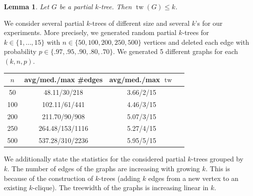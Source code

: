 \documentclass[11pt,a4paper]{article}
\newtheorem*{lemma}{Lemma}
\DeclareMathOperator{\tw}{tw}
\begin{document}
\begin{lemma}
Let $G$ be a partial $k$-tree. Then $\tw(G) \leq k$.
\end{lemma}

\newpage

We consider several partial $k$-trees of different size and several $k$'s for our experiments. More precisely, we generated random partial $k$-trees for $k \in \{1, \dots, 15\}$ with $n \in \{50,100,200,250,500\}$ vertices and deleted each edge with probability $p \in \{.97, .95, .90, .80, .70\}$. We generated 5 different graphs for each $(k, n, p)$.

\begin{center}
\begin{table}[h!]
\centering
\begin{tabular}{|c|c|c|c|}
\hline
$n$ & avg/med./max \#edges & avg/med./max $\tw$ \\
\hline \hline
50 & 48.11/30/218 & 3.66/2/15 \\
\hline
100 & 102.11/61/441 & 4.46/3/15 \\
\hline
200 & 211.70/90/908 & 5.07/3/15 \\
\hline
250 & 264.48/153/1116 & 5.27/4/15 \\
\hline
500 & 537.28/310/2236 & 5.95/5/15 \\
\hline
\end{tabular}
\end{table}
\end{center}

\vspace*{-7mm}

We additionally state the statistics for the considered partial $k$-trees grouped by $k$. The number of edges of the graphs are increasing with growing $k$. This is because of the construction of $k$-trees (adding $k$ edges from a new vertex to an existing $k$-clique). The treewidth of the graphs is increasing linear in $k$.
\end{document}
